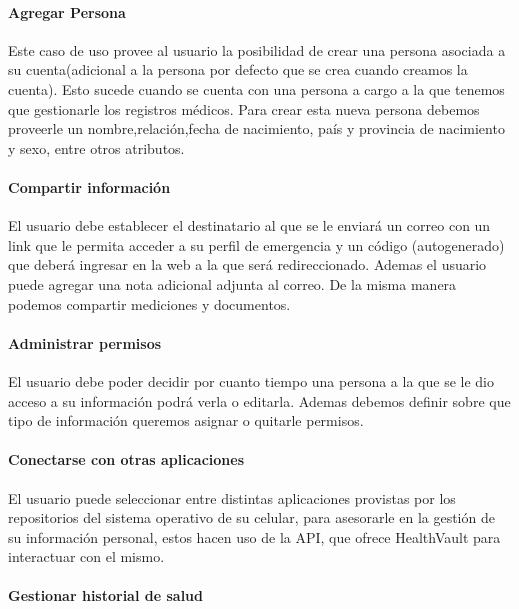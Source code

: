  {\correccionTexto
 	
\paragraph{Agregar Persona}

Este caso de uso provee al usuario la posibilidad de crear una persona asociada a su cuenta(adicional a la persona por defecto que se crea cuando creamos la cuenta). Esto sucede cuando se cuenta con una persona a cargo a la que tenemos que gestionarle los registros médicos. Para crear esta nueva persona debemos proveerle un nombre,relación,fecha de nacimiento, país y provincia de nacimiento y sexo, entre otros atributos.
 
\paragraph{Compartir información}
 
El usuario debe establecer el destinatario al que se le enviará un correo con un link que le permita acceder a su perfil de emergencia y un código (autogenerado) que deberá ingresar en la web a la que será redireccionado. Ademas el usuario puede agregar una nota adicional adjunta al correo. De la misma manera podemos compartir mediciones y documentos.

\paragraph{Administrar permisos}

El usuario debe poder decidir por cuanto tiempo una persona a la que se le dio acceso a su información podrá verla o editarla. Ademas debemos definir sobre que tipo de información queremos asignar o quitarle permisos.

\paragraph{Conectarse con otras aplicaciones}

El usuario puede seleccionar entre distintas aplicaciones provistas por los repositorios del sistema operativo de su celular, para asesorarle en la gestión de su información personal, estos hacen uso de la API, que ofrece HealthVault para interactuar con el mismo.

\paragraph{Gestionar historial de salud}

}
